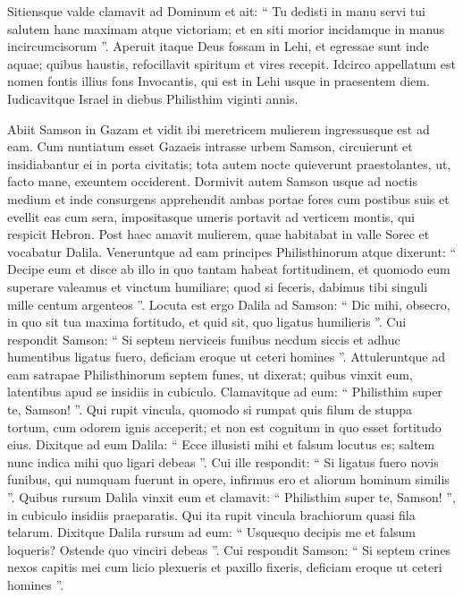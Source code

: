 \begin{biblechapter}
\begin{biblechapter}
\begin{biblechapter}
\begin{biblechapter}
\begin{biblechapter}
\begin{biblechapter}
\begin{biblechapter}
\begin{biblechapter}
\begin{biblechapter}
\begin{biblechapter}
\begin{biblechapter}
\begin{biblechapter}
\begin{biblechapter}
\begin{biblechapter}
\begin{biblechapter}
\verse Sitiensque valde clamavit ad Dominum et ait: “ Tu dedisti in manu servi tui salutem hanc maximam atque victoriam; et en siti morior incidamque in manus incircumcisorum ”. 
\verse Aperuit itaque Deus fossam in Lehi, et egressae sunt inde aquae; quibus haustis, refocillavit spiritum et vires recepit. Idcirco appellatum est nomen fontis illius fons Invocantis, qui est in Lehi usque in praesentem diem.
 \verse Iudicavitque Israel in diebus Philisthim viginti annis.
 
\begin{biblechapter}
\verse Abiit Samson in Gazam et vidit ibi meretricem mulierem ingressusque est ad eam. 
\verse Cum nuntiatum esset Gazaeis intrasse urbem Samson, circuierunt et insidiabantur ei in porta civitatis; tota autem nocte quieverunt praestolantes, ut, facto mane, exeuntem occiderent. 
\verse Dormivit autem Samson usque ad noctis medium et inde consurgens apprehendit ambas portae fores cum postibus suis et evellit eas cum sera, impositasque umeris portavit ad verticem montis, qui respicit Hebron.
 \verse Post haec amavit mulierem, quae habitabat in valle Sorec et vocabatur Dalila. 
\verse Veneruntque ad eam principes Philisthinorum atque dixerunt: “ Decipe eum et disce ab illo in quo tantam habeat fortitudinem, et quomodo eum superare valeamus et vinctum humiliare; quod si feceris, dabimus tibi singuli mille centum argenteos ”.
 \verse Locuta est ergo Dalila ad Samson: “ Dic mihi, obsecro, in quo sit tua maxima fortitudo, et quid sit, quo ligatus humilieris ”. 
\verse Cui respondit Samson: “ Si septem nerviceis funibus necdum siccis et adhuc humentibus ligatus fuero, deficiam eroque ut ceteri homines ”. 
\verse Attuleruntque ad eam satrapae Philisthinorum septem funes, ut dixerat; quibus vinxit eum, 
\verse latentibus apud se insidiis in cubiculo. Clamavitque ad eum: “ Philisthim super te, Samson! ”. Qui rupit vincula, quomodo si rumpat quis filum de stuppa tortum, cum odorem ignis acceperit; et non est cognitum in quo esset fortitudo eius.
 \verse Dixitque ad eum Dalila: “ Ecce illusisti mihi et falsum locutus es; saltem nunc indica mihi quo ligari debeas ”. 
\verse Cui ille respondit: “ Si ligatus fuero novis funibus, qui numquam fuerunt in opere, infirmus ero et aliorum hominum similis ”. 
\verse Quibus rursum Dalila vinxit eum et clamavit: “ Philisthim super te, Samson! ”, in cubiculo insidiis praeparatis. Qui ita rupit vincula brachiorum quasi fila telarum.
 \verse Dixitque Dalila rursum ad eum: “ Usquequo decipis me et falsum loqueris? Ostende quo vinciri debeas ”. Cui respondit Samson: “ Si septem crines nexos capitis mei cum licio plexueris et paxillo fixeris, deficiam eroque ut ceteri homines ”. 

\end{biblechapter}
\end{biblechapter}
\end{biblechapter}
\end{biblechapter}
\end{biblechapter}
\end{biblechapter}
\end{biblechapter}
\end{biblechapter}
\end{biblechapter}
\end{biblechapter}
\end{biblechapter}
\end{biblechapter}
\end{biblechapter}
\end{biblechapter}
\end{biblechapter}
\end{biblechapter}

